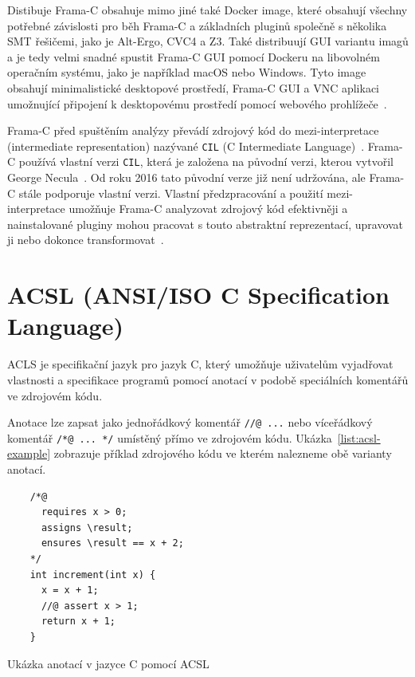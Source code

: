 Distibuje Frama\mbox{-}C obsahuje mimo jiné také Docker image, které obsahují všechny potřebné závislosti
pro běh Frama\mbox{-}C a základních pluginů společně s několika SMT řešičemi, jako je Alt-Ergo, CVC4 a Z3.
Také distribuují GUI variantu imagů a je tedy velmi snadné spustit Frama\mbox{-}C GUI pomocí Dockeru na libovolném operačním systému,
jako je například macOS nebo Windows.
Tyto image obsahují minimalistické desktopové prostředí, Frama\mbox{-}C GUI a VNC aplikaci
umožnující připojení k desktopovému prostředí pomocí webového prohlížeče~\cite{FCDockerGUIMaroneze2021}.


Frama\mbox{-}C před spuštěním analýzy převádí zdrojový kód do mezi-interpretace (intermediate representation)
nazývané \texttt{CIL} (C Intermediate Language)~\cite{BlanchardACSL2024}.
Frama\mbox{-}C používá vlastní verzi \texttt{CIL}, která je založena na původní verzi, kterou vytvořil George Necula~\cite{Necula2002CIL}.
Od roku 2016 tato původní verze již není udržována, ale Frama\mbox{-}C stále podporuje vlastní verzi.
Vlastní předzpracování a použití mezi-interpretace umožňuje Frama\mbox{-}C
analyzovat zdrojový kód efektivněji a nainstalované pluginy mohou pracovat
s touto abstraktní reprezentací, upravovat ji nebo dokonce transformovat~\cite{FCKernelMaroneze2024}.

\section{ACSL (ANSI/ISO C Specification Language)}
\label{sec:acsl}

ACLS je specifikační jazyk pro jazyk C, který umožňuje uživatelům
vyjadřovat vlastnosti a specifikace programů pomocí anotací v podobě speciálních komentářů ve zdrojovém kódu.

Anotace lze zapsat jako jednořádkový komentář \texttt{//@ ...} nebo víceřádkový komentář \texttt{/*@ ... */} umístěný přímo ve zdrojovém kódu.
Ukázka~\ref{list:acsl-example} zobrazuje příklad zdrojového kódu ve kterém nalezneme obě varianty anotací.

\begin{listing}[H]
    \begin{verbatim}
    /*@
      requires x > 0;
      assigns \result;
      ensures \result == x + 2;
    */
    int increment(int x) {
      x = x + 1;
      //@ assert x > 1;
      return x + 1;
    }
    \end{verbatim}
    \caption{Ukázka anotací v jazyce C pomocí ACSL}
    \label{list:acsl-example}
\end{listing}


